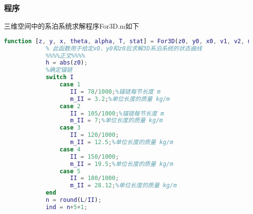         \subsubsection{程序}
            \par
            三维空间中的系泊系统求解程序For3D.m如下
            \begin{lstlisting}[language = Matlab]
            function [z, y, x, theta, alpha, T, stat] = For3D(z0, y0, x0, v1, v2, m_qiu, I, L, beta, xitong_figure)
            % 此函数用于给定x0、y0和z0后求解3D系泊系统的状态曲线
            %%%%正文%%%%
            h = abs(z0);
            %确定锚链
            switch I
                case 1
                   II = 78/1000;%锚链每节长度 m
                   m_II = 3.2;%单位长度的质量 kg/m
                case 2
                   II = 105/1000;%锚链每节长度 m
                   m_II = 7;%单位长度的质量 kg/m
                case 3
                   II = 120/1000;
                   m_II = 12.5;%单位长度的质量 kg/m
                case 4
                   II = 150/1000;
                   m_II = 19.5;%单位长度的质量 kg/m
                case 5
                   II = 180/1000;
                   m_II = 28.12;%单位长度的质量 kg/m
            end
            n = round(L/II);
            ind = n+5+1;


\end{lstlisting}
